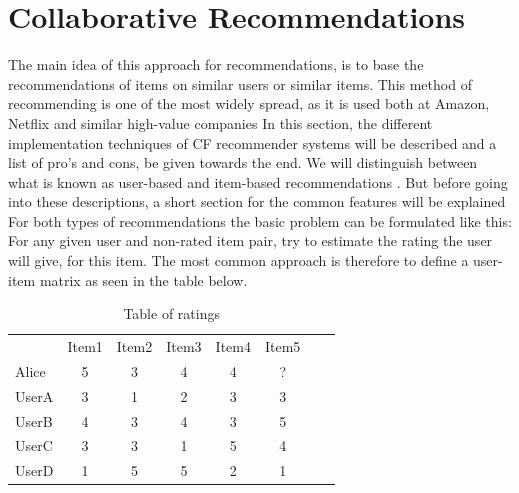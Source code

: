 \section{Collaborative Recommendations}
\label{sec:collaborative}
The main idea of this approach for recommendations, is to base the recommendations of items on similar users or similar items.\newline
This method of recommending is one of the most widely spread, as it is used both at Amazon, Netflix and similar high-value companies \citep{AmazonRecommendations}\newline
In this section, the different implementation techniques of CF recommender systems will be described and a list of pro's and cons, be given towards the end. We will distinguish between what is known as user-based and item-based recommendations \citep{IntroductionRecommenderSystems}. But before going into these descriptions, a short section for the common features will be explained\newline
For both types of recommendations the basic problem can be formulated like this: For any given user and non-rated item pair, try to estimate the rating the user will give, for this item.\newline
The most common approach is therefore to define a user-item matrix as seen in the table below.


\begin{table}[H]
\begin{center}
\begin{tabular}{l c c c c c c r }
  & Item1 & Item2 & Item3 & Item4 & Item5 \\ 
 Alice & 5 & 3 & 4 & 4 & ? \\
 UserA & 3 & 1 & 2 & 3 & 3 \\
 UserB & 4 & 3 & 4 & 3 & 5 \\
 UserC & 3 & 3 & 1 & 5 & 4 \\
 UserD & 1 & 5 & 5 & 2 & 1
\end{tabular}
\caption{Table of ratings}
\label{tableofratings} 
\end{center}
\end{table}



